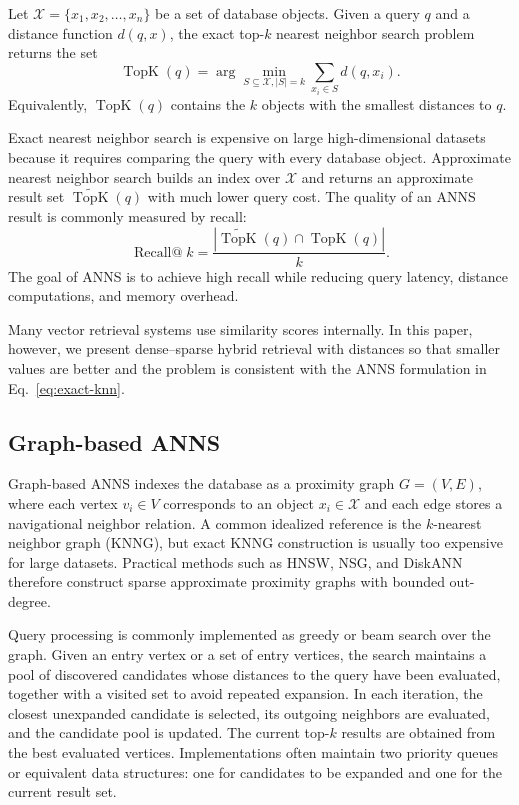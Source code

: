 Let $\mathcal{X}=\{x_1,x_2,\ldots,x_n\}$ be a set of database objects. Given a query $q$ and a distance function $d(q,x)$, the exact top-$k$ nearest neighbor search problem returns the set
\begin{equation}
    \operatorname{TopK}(q)
    = \arg\min_{S\subseteq\mathcal{X}, |S|=k}
    \sum_{x_i\in S} d(q,x_i).
    \label{eq:exact-knn}
\end{equation}
Equivalently, $\operatorname{TopK}(q)$ contains the $k$ objects with the smallest distances to $q$.

Exact nearest neighbor search is expensive on large high-dimensional datasets because it requires comparing the query with every database object. Approximate nearest neighbor search builds an index over $\mathcal{X}$ and returns an approximate result set $\widetilde{\operatorname{TopK}}(q)$ with much lower query cost. The quality of an ANNS result is commonly measured by recall:
\begin{equation}
    \operatorname{Recall@}k
    = \frac{|\widetilde{\operatorname{TopK}}(q) \cap \operatorname{TopK}(q)|}{k}.
\end{equation}
The goal of ANNS is to achieve high recall while reducing query latency, distance computations, and memory overhead.

Many vector retrieval systems use similarity scores internally. In this paper, however, we present dense--sparse hybrid retrieval with distances so that smaller values are better and the problem is consistent with the ANNS formulation in Eq.~\eqref{eq:exact-knn}.

\subsection{Graph-based ANNS}

Graph-based ANNS indexes the database as a proximity graph $G=(V,E)$, where each vertex $v_i\in V$ corresponds to an object $x_i\in\mathcal{X}$ and each edge stores a navigational neighbor relation. A common idealized reference is the $k$-nearest neighbor graph (KNNG), but exact KNNG construction is usually too expensive for large datasets. Practical methods such as HNSW, NSG, and DiskANN therefore construct sparse approximate proximity graphs with bounded out-degree.

Query processing is commonly implemented as greedy or beam search over the graph. Given an entry vertex or a set of entry vertices, the search maintains a pool of discovered candidates whose distances to the query have been evaluated, together with a visited set to avoid repeated expansion. In each iteration, the closest unexpanded candidate is selected, its outgoing neighbors are evaluated, and the candidate pool is updated. The current top-$k$ results are obtained from the best evaluated vertices. Implementations often maintain two priority queues or equivalent data structures: one for candidates to be expanded and one for the current result set.

